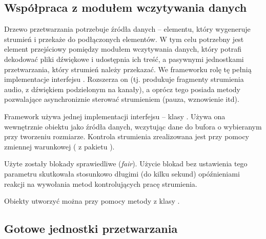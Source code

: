 \subsection{Współpraca z modułem wczytywania danych}

Drzewo przetwarzania potrzebuje źródła danych -- elementu, który wygeneruje strumień i przekaże do
podłączonych elementów. W tym celu potrzebny jest element przejściowy pomiędzy modułem wczytywania
danych, który potrafi dekodować pliki dźwiękowe i udostępnia ich treść, a pasywnymi jednostkami
przetwarzania, który strumień należy przekazać. We frameworku rolę tę pełnią implementacje
interfejsu . Rozszerza on  (tj. produkuje
fragmenty strumienia audio, z dźwiękiem podzielonym na kanały), a oprócz tego posiada metody
pozwalające asynchroniznie sterować strumieniem (pauza, wznowienie itd).

Framework używa jednej implementacji interfejsu  -- klasy
. Używa ona wewnętrznie obiektu  jako źródła danych,
wczytując dane do bufora o wybieranym przy tworzeniu rozmiarze. Kontrola strumienia zrealizowana
jest przy pomocy zmiennej warunkowej ( z pakietu ).

\begin{Note}
  Użyte zostały blokady sprawiedliwe (\textit{fair}). Użycie blokad bez ustawienia tego parametru
  skutkowała stosunkowo długimi (do kilku sekund) opóźnieniami reakcji na wywołania metod
  kontrolujących pracę strumienia.
\end{Note}

Obiekty  utworzyć można przy pomocy metody  z klasy
.


\subsection{Gotowe jednostki przetwarzania}



